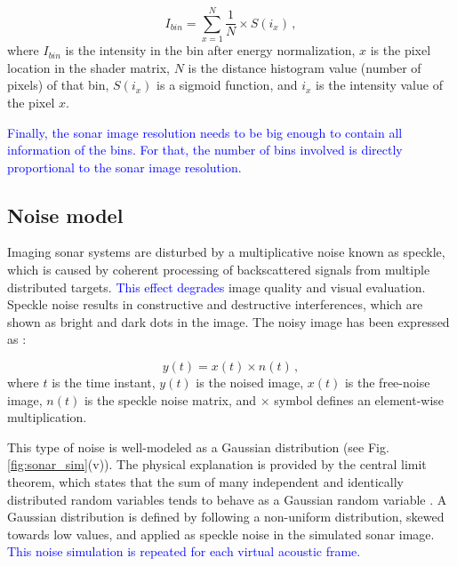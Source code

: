 \documentclass[final,5p,times]{elsarticle}
\begin{document}
\begin{equation}
    \label{eq:1}
    I_{bin} = \sum\limits_{x=1}^N \frac{1}{N} \times S(i_{x}) \, ,
\end{equation}
where $I_{bin}$ is the intensity in the bin after energy normalization,
$x$ is the pixel location in the shader matrix, $N$ is the distance histogram
value (number of pixels) of that bin, $S(i_{x})$ is a sigmoid function,
and $i_{x}$ is the intensity value of the pixel $x$.

\textcolor{blue}{Finally, the sonar image resolution needs to be big enough to contain all
information of the bins. For that, the number of bins involved is directly
proportional to the sonar image resolution.}


\subsection{Noise model}
\label{dev:noise}

Imaging sonar systems are disturbed by a multiplicative noise known as speckle,
which is caused by coherent processing of backscattered signals from multiple
distributed targets. \textcolor{blue}{This effect degrades} image quality and visual
evaluation. Speckle noise results in constructive and destructive interferences,
which are shown as bright and dark dots in the image. The noisy image has been
expressed as \cite{lee1980}:

\begin{equation}
\label{eq:2}
y(t) = x(t) \times n(t) \, ,
\end{equation}
where $t$ is the time instant, $y(t)$ is the noised image, $x(t)$ is the
free-noise image, $n(t)$ is the speckle noise matrix, and $\times$ symbol defines an
element-wise multiplication.

This type of noise is well-modeled as a Gaussian distribution (see Fig. \ref{fig:sonar_sim}(v)). The physical explanation is provided by the central limit theorem, which states that the
sum of many independent and identically distributed random variables tends
to behave as a Gaussian random variable \textcolor{blue}{\cite{papoulis2002}}. A Gaussian distribution is defined by following a non-uniform distribution, skewed towards low values, and applied as speckle noise in the simulated sonar image. \textcolor{blue}{This noise simulation is repeated for each virtual acoustic frame.}
\end{document}
